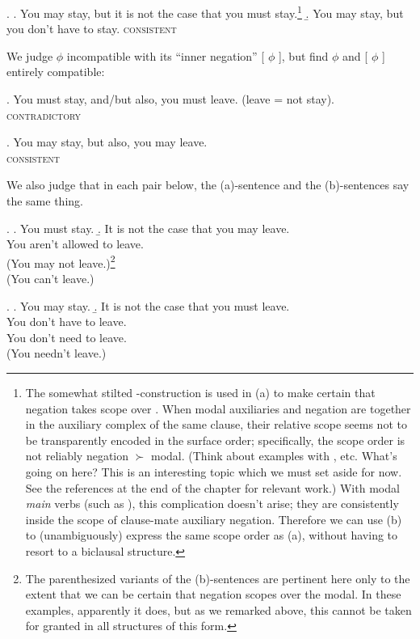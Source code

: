 \ex. \a. You may stay, but it is not the case that you must stay.\footnote{The
  somewhat stilted -construction is used in (a)
  to make certain that negation takes scope over . When modal
  auxiliaries and negation are together in the auxiliary complex of the same
  clause, their relative scope seems not to be transparently encoded in the
  surface order; specifically, the scope order is not reliably negation $\succ$
  modal. (Think about examples with ,  etc. What's going on here? This is an interesting topic
  which we must set aside for now. See the references at the end of the chapter
  for relevant work.) With modal \emph{main} verbs (such as ), this complication doesn't arise; they are consistently inside the
  scope of clause-mate auxiliary negation. Therefore we can use (b) to
  (unambiguously) express the same scope order as (a), without having to resort
  to a biclausal structure.} \b. You may stay, but you don't have to stay.
\hfill\textsc{consistent}

We judge  $\phi$ incompatible with its ``inner negation''
 [ $\phi$ ], but find  $\phi$
and  [ $\phi$ ] entirely compatible:

\ex. You must stay, and/but also, you must leave. (leave = not stay).\\
\null\hfill\textsc{contradictory}

\ex. You may stay, but also, you may leave. \\
\null\hfill\textsc{consistent}

We also judge that in each pair below, the (a)-sentence and the (b)-sentences
say the same thing.

\ex. \a. You must stay. \b. It is not the case that you may leave.\\
You aren't allowed to leave.\\
(You may not leave.)\footnote{The parenthesized variants of the (b)-sentences are pertinent here only to the extent that we can be certain that negation scopes over the modal. In these examples, apparently it does, but as we remarked above, this cannot be taken for granted in all structures of this form.}\\
(You can't leave.)

\ex. \a. You may stay. \b. It is not the case that you must leave.\\
You don't have to leave.\\
You don't need to leave.\\
(You needn't leave.)

